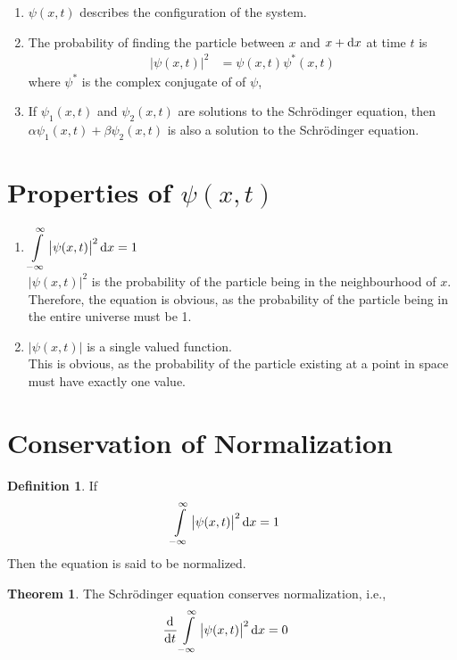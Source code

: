 \documentclass[titlepage, fleqn, a4paper, 12pt, twoside]{article}
\theoremstyle{definition}
\newtheorem{definition}{Definition}
\theoremstyle{theorem}
\newtheorem{theorem}{Theorem}
\begin{document}
\begin{enumerate}
	\item
		$\psi(x,t)$ describes the configuration of the system.
	\item
		The probability of finding the particle between $x$ and $x + \dif x$ at time $t$ is
		\begin{align*}
			\left| \psi(x,t) \right|^2 & = \psi(x,t) \psi^*(x,t)
		\end{align*}
		where $\psi^*$ is the complex conjugate of of $\psi$,
	\item
		If $\psi_1(x,t)$ and $\psi_2(x,t)$ are solutions to the Schrödinger equation, then $\alpha \psi_1(x,t) + \beta \psi_2(x,t)$ is also a solution to the Schrödinger equation.
\end{enumerate}

\section{Properties of $\psi(x,t)$}

\begin{enumerate}
	\item
		$\displaystyle \int\limits_{-\infty}^{\infty} \left| \psi(x,t) \right|^2 \dif x = 1$\\
		$\left| \psi(x,t) \right|^2$ is the probability of the particle being in the neighbourhood of $x$.
		Therefore, the equation is obvious, as the probability of the particle being in the entire universe must be 1.
	\item
		$\left| \psi(x,t) \right|$ is a single valued function.\\
		This is obvious, as the probability of the particle existing at a point in space must have exactly one value.
\end{enumerate}

\section{Conservation of Normalization}

\begin{definition}
	If
	\begin{align*}
		\int\limits_{-\infty}^{\infty} \left| \psi(x,t) \right|^2 \dif x & = 1
	\end{align*}
	Then the equation is said to be normalized.
\end{definition}

\begin{theorem}
	The Schrödinger equation conserves normalization, i.e.,
	\begin{align*}
		\dod{}{t} \int\limits_{-\infty}^{\infty} \left| \psi(x,t) \right|^2 \dif x & = 0
	\end{align*}
\end{theorem}
\end{document}
